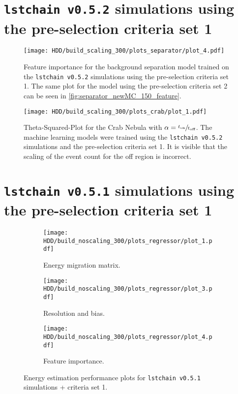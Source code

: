 \section{\texttt{lstchain v0.5.2} simulations using the pre-selection criteria set 1}
\begin{figure}
    \centering
    \texttt{[image: HDD/build\_scaling\_300/plots\_separator/plot\_4.pdf]}
    \caption{Feature importance for the background separation model trained on the \texttt{lstchain v0.5.2} simulations using the pre-selection criteria set 1.
        The same plot for the model using the pre-selection criteria set 2 can be seen in \autoref{fig:separator_newMC_150_feature}.
    }
    \label{fig:separator_newMC_300_feature}
\end{figure}
\begin{figure}
    \centering
    \texttt{[image: HDD/build\_scaling\_300/plots\_crab/plot\_1.pdf]}
    \caption{Theta-Squared-Plot for the Crab Nebula with $\alpha = \sfrac{t_\text{on}}{t_\text{off}}$.
        The machine learning models were trained using the \texttt{lstchain v0.5.2} simulations and the pre-selection criteria set 1.
        It is visible that the scaling of the event count for the off region is incorrect.
    }
    \label{fig:crab_best_total_time}
\end{figure}


\section{\texttt{lstchain v0.5.1} simulations using the pre-selection criteria set 1}

\begin{figure}
    \centering
    \begin{subfigure}{0.49\textwidth}
        \centering
        \texttt{[image: HDD/build\_noscaling\_300/plots\_regressor/plot\_1.pdf]}
        \caption{Energy migration matrix.}
    \end{subfigure}
    \hfill
    \begin{subfigure}{0.49\textwidth}
        \centering
        \texttt{[image: HDD/build\_noscaling\_300/plots\_regressor/plot\_3.pdf]}
        \caption{Resolution and bias.}
    \end{subfigure}
    \newline\vfill
    \begin{subfigure}{0.49\textwidth}
        \centering
        \texttt{[image: HDD/build\_noscaling\_300/plots\_regressor/plot\_4.pdf]}
        \caption{Feature importance.}
    \end{subfigure}
    \caption{Energy estimation performance plots for \texttt{lstchain v0.5.1} simulations + criteria set 1.}
    \label{fig:regressor_oldMC_300}
\end{figure}

